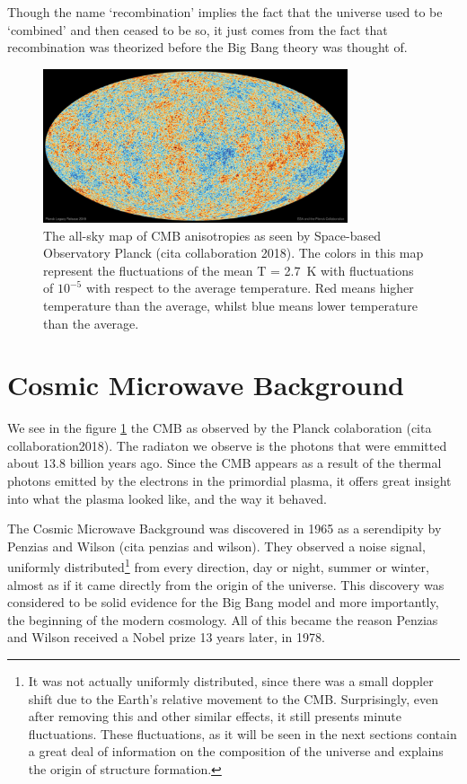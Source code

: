 Though the name `recombination' implies the fact that the universe used to be `combined' and then ceased to be so, it just comes from the fact that recombination was theorized before the Big Bang theory was thought of.



\begin{figure}[t]
	\centering
	\includegraphics[width=0.8\textwidth]{../figs/cmb.jpeg}
	\caption{The all-sky map of CMB anisotropies as seen by Space-based Observatory Planck (cita collaboration 2018). The colors in this map represent the fluctuations of the mean T = \SI{2.7}{K} with fluctuations of $10^{-5}$ with respect to the average temperature. Red means higher temperature than the average, whilst blue means lower temperature than the average.}
	\label{fig:cmb}
\end{figure}
\section{Cosmic Microwave Background}

We see in the figure \ref{fig:cmb} the CMB as observed by the Planck colaboration (cita collaboration2018). The radiaton we observe is the photons that were emmitted about $13.8$ billion years ago. Since the CMB appears as a result of the thermal photons emitted by the electrons in the primordial plasma, it offers great insight into what the plasma looked like, and the way it behaved. 

The Cosmic Microwave Background was discovered in 1965 as a serendipity by Penzias and Wilson (cita penzias and wilson). They observed a noise signal, uniformly distributed\footnote{It was not actually uniformly distributed, since there was a small doppler shift due to the Earth's relative movement to the CMB. Surprisingly, even after removing this and other similar effects, it still presents minute fluctuations. These fluctuations, as it will be seen in the next sections contain a great deal of information on the composition of the universe and explains the origin of structure formation.} from every direction, day or night, summer or winter, almost as if it came directly from the origin of the universe.
This discovery was considered to be solid evidence for the Big Bang model and more importantly, the beginning of the modern cosmology. All of this became the reason Penzias and Wilson received a Nobel prize 13 years later, in 1978.

